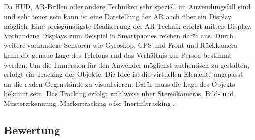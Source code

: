 \documentclass[12pt,a4paper,bibliography=totocnumbered,listof=totocnumbered]{scrartcl}
\begin{document}
Da HUD, AR-Brillen oder andere Techniken sehr speziell im Anwendungsfall sind und sehr teuer sein kann ist eine Darstellung der AR auch über ein Display möglich. Eine preisgünstigste Realisierung der AR Technik erfolgt mittels Display. Vorhandene Displays zum Beispiel in Smartphones reichen dafür aus. Durch weitere vorhandene Sensoren wie Gyroskop, GPS und Front und Rückkamera kann die genaue Lage des Telefons und das Verhältnis zur Person bestimmt werden.\newline
Um die Immersion für den Anwender möglichst authentisch zu gestalten, erfolgt ein Tracking der Objekte. Die Idee ist die virtuellen Elemente angepasst an die realen Gegenstände zu visualisieren. Dafür muss die Lage des Objekts bekannt sein. Das Tracking erfolgt wahlweise über Stereokameras, Bild- und Mustererkennung, Markertracking oder Inertialtracking \cite{Tonnis:2010aa}.
\subsection{Bewertung}

\end{document}
